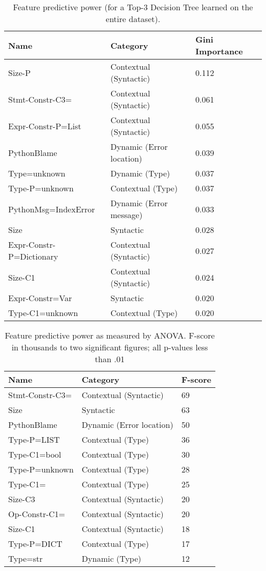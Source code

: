\documentclass[conference]{IEEEtran}
\begin{document}
\begin{table}[]
\begin{tabular}{lll}
Name & Category & Gini Importance \\ \bottomrule
Size-P & Contextual (Syntactic)               & 0.112 \\
Stmt-Constr-C3= & Contextual (Syntactic)      & 0.061 \\
Expr-Constr-P=List & Contextual (Syntactic)   & 0.055 \\
PythonBlame & Dynamic (Error location)        & 0.039 \\
Type=unknown & Dynamic (Type)                 & 0.037 \\
Type-P=unknown & Contextual (Type)            & 0.037 \\
PythonMsg=IndexError & Dynamic (Error message)& 0.033 \\
Size & Syntactic                              & 0.028 \\
Expr-Constr-P=Dictionary & Contextual (Syntactic) & 0.027 \\
Size-C1 & Contextual (Syntactic)              & 0.024 \\
Expr-Constr=Var & Syntactic                   & 0.020 \\
Type-C1=unknown & Contextual (Type)           & 0.020 \\
\toprule
\end{tabular}
\caption{Feature predictive power (for a Top-3 Decision Tree
learned on the entire dataset).}
\label{tab-feature-predictive-power}
\end{table}

\begin{table}[]
\begin{tabular}{lll}
Name & Category & F-score \\ \bottomrule
Stmt-Constr-C3= & Contextual (Syntactic) & 69 \\
Size & Syntactic                         & 63 \\
PythonBlame & Dynamic (Error location)   & 50 \\
Type-P=LIST & Contextual (Type)          & 36 \\
Type-C1=bool & Contextual (Type)         & 30 \\
Type-P=unknown & Contextual (Type)       & 28 \\
Type-C1= & Contextual (Type)             & 25 \\
Size-C3 & Contextual (Syntactic)         & 20 \\
Op-Constr-C1= & Contextual (Syntactic)   & 20 \\
Size-C1 & Contextual (Syntactic)         & 18 \\
Type-P=DICT & Contextual (Type)          & 17 \\
Type=str & Dynamic (Type)                & 12 \\
\toprule
\end{tabular}
\caption{Feature predictive power as measured by ANOVA. F-score in
thousands to two significant figures; all p-values less than .01}
\label{tab-anova}
\end{table}
\end{document}
